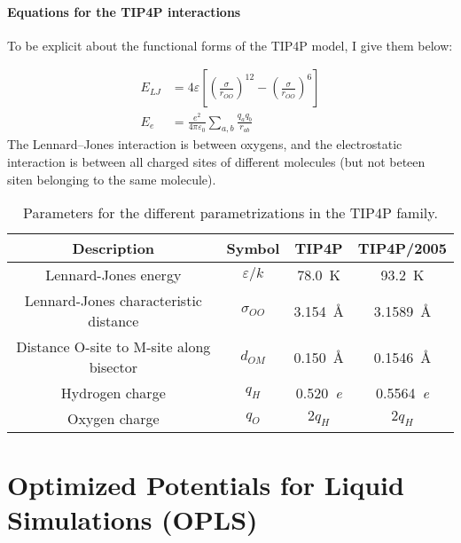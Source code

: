 \paragraph{Equations for the TIP4P interactions}
To be explicit about the functional forms of the TIP4P model, I give them below:

\begin{align}
	E_{LJ} & = 4\varepsilon\left[\left(\frac{\sigma}{r_{OO}}\right)^{12} - \left(\frac{\sigma}{r_{OO}}\right)^{6}\right]
	\label{eq:part1:lennardjonespotential}
	\\
	E_{\si{\elementarycharge}} & = \frac{\si{\elementarycharge\squared}}{4\pi\varepsilon_0} \sum_{a, b} \frac{q_aq_b}{r_{ab}}
	\label{eq:part1:electrostaticpotential}
\end{align} 
The Lennard--Jones interaction is between oxygens, and the electrostatic interaction is between all charged sites of different molecules (but not beteen siten belonging to the same molecule).

\begin{table}
\caption{Parameters for the different parametrizations in the TIP4P family.}
\label{tbl:tip4p_parameters}
\begin{tabular}{c|c|c|c}
Description & Symbol & TIP4P & TIP4P/2005 \\ 
\hline
Lennard-Jones energy & $\varepsilon/k$ & \SI{78.0}{\kelvin} & \SI{93.2}{\kelvin} \\
Lennard-Jones characteristic distance & $\sigma_{OO}$ & \SI{3.154}{\angstrom} & \SI{3.1589}{\angstrom} \\
Distance O-site to M-site along bisector & $d_{OM}$ & \SI{0.150}{\angstrom} & \SI{0.1546}{\angstrom} \\
Hydrogen charge & $q_H$ & \SI{0.520}{\elementarycharge} & \SI{0.5564}{\elementarycharge} \\
Oxygen charge & $q_O$ & $2q_H$ & $2q_H$ 
\end{tabular}
\end{table}

\section{Optimized Potentials for Liquid Simulations (OPLS)}

